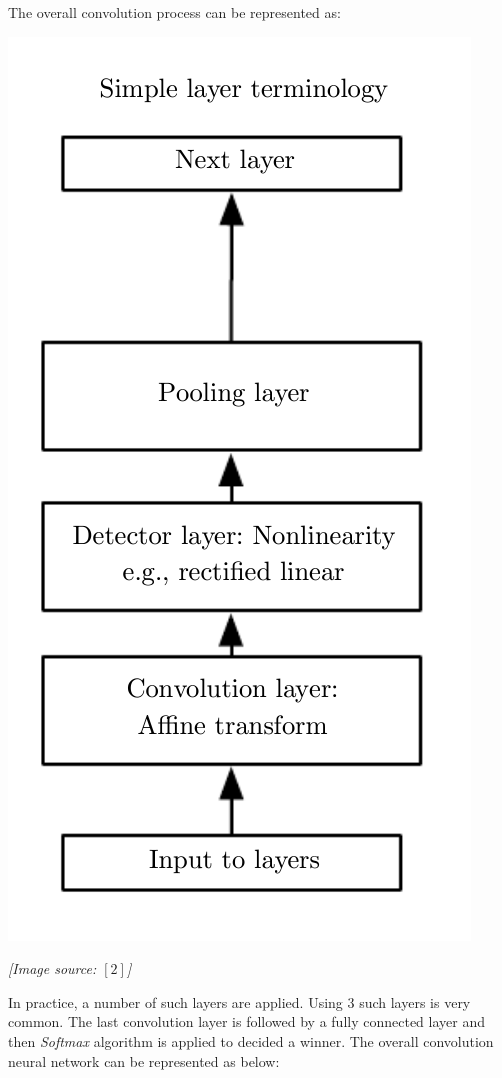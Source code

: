 \documentclass{article}
\begin{document}
The overall convolution process can be represented as:
\begin{center}
	\includegraphics[scale=0.2]{diagram}
\end{center}
\begin{center}
	\textit{[Image source: ${[2]}$]}
\end{center}

In practice, a number of such layers are applied. Using 3 such layers is very common. The last convolution layer is followed by a fully connected layer and then \textit{Softmax} algorithm is applied to decided a winner. The overall convolution neural network can be represented as below:
\end{document}
